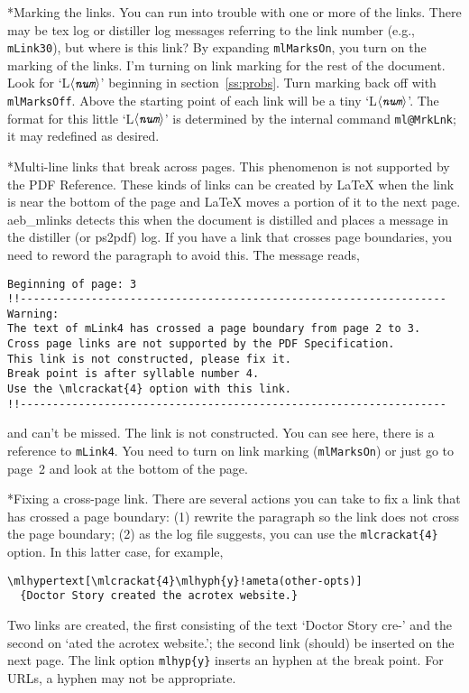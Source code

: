 \documentclass{article}
\makeatletter
\def\amtIndent{15pt}
\def\anglemeta#1{$\langle\textit{\texttt{#1}}\rangle$}
\let\ameta\anglemeta
\def\darg#1{\texttt{\{#1\}}}
\let\pkg\textsf
\let\app\textsf
\def\cs#1{\texttt{\@backslashchar#1}}
\renewcommand{\paragraph}
    {\@startsection{paragraph}{4}{0pt}{6pt}{-3pt}{\bfseries}}
\renewcommand{\subparagraph}
    {\@startsection{subparagraph}{5}{15pt}{6pt}{-3pt}{\bfseries}}
\makeatother
\begin{document}
\paragraph*{Marking the links.} You can run into trouble with one or more of the links. There
may be tex log or distiller log messages referring to the link number (e.g.,
\texttt{mLink30}), but where is this link? By expanding \cs{mlMarksOn}, you
turn on the marking of the links. I'm turning on link marking for the rest of
the document. Look for `L\ameta{num}' beginning in section~\ref{ss:probs}.
Turn marking back off with \cs{mlMarksOff}. Above the starting point of each
link will be a tiny `L\ameta{num}'. The format for this little `L\ameta{num}'
is determined by the internal command \cs{ml@MrkLnk}; it may redefined as
desired.

\mlMarksOn

\paragraph*{Multi-line links that break across pages.}\label{para:xpage} This phenomenon is not
supported by the PDF Reference. These kinds of links can be created by
{\LaTeX} when the link is near the bottom of the page and {\LaTeX} moves a
portion of it to the next page. \pkg{aeb\_mlinks} detects this when the
document is distilled and places a message in the distiller (or \app{ps2pdf}) log. If you have
a link that crosses page boundaries, you need to reword the paragraph to
avoid this. The message reads,\goodbreak
\begin{Verbatim}[fontsize=\small]
Beginning of page: 3
!!------------------------------------------------------------------
Warning:
The text of mLink4 has crossed a page boundary from page 2 to 3.
Cross page links are not supported by the PDF Specification.
This link is not constructed, please fix it.
Break point is after syllable number 4.
Use the \mlcrackat{4} option with this link.
!!------------------------------------------------------------------
\end{Verbatim}
and can't be missed. The link is not constructed. You can see here, there is a reference
to \texttt{mLink4}. You need to turn on link marking (\cs{mlMarksOn}) or just go to page~2
and look at the bottom of the page.

\subparagraph*{Fixing a cross-page link.}\label{spara:fixxpage} There are several actions you can
take to fix a link that has crossed a page boundary: (1) rewrite the
paragraph so the link does not cross the page boundary; (2) as the log file suggests, you
can use the \cs{mlcrackat\darg{4}} option. In this latter case, for example,
\begin{Verbatim}[xleftmargin=\amtIndent,fontsize=\small,commandchars=!()]
\mlhypertext[\mlcrackat{4}\mlhyph{y}!ameta(other-opts)]
  {Doctor Story created the acrotex website.}
\end{Verbatim}
Two links are created, the first consisting of the text `Doctor Story cre-'
and the second on `ated the acrotex website.'; the second link (should) be
inserted on the next page. The link  option \cs{mlhyp\darg{y}} inserts an
hyphen at the break point. For URLs, a hyphen may not be appropriate.
\end{document}
